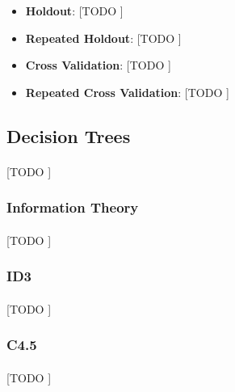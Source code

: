 \documentclass{article}
\begin{document}
		\begin{itemize}
			\item
				\textbf{Holdout}:
				[TODO ]

			\item
				\textbf{Repeated Holdout}:
				[TODO ]

			\item
				\textbf{Cross Validation}:
				[TODO ]

			\item
				\textbf{Repeated Cross Validation}:
				[TODO ]

		\end{itemize}

		\subsection{Decision Trees}
		\label{sec:decision-trees}

			\paragraph{}
			[TODO ]


			\subsubsection{Information Theory}
			\label{sec:information-theory}

				\paragraph{}
				[TODO ]

			\subsubsection{ID3}
			\label{sec:id3-tree}

				\paragraph{}
				[TODO ]

			\subsubsection{C4.5}
			\label{sec:c45-trees}

				\paragraph{}
				[TODO ]
\end{document}
